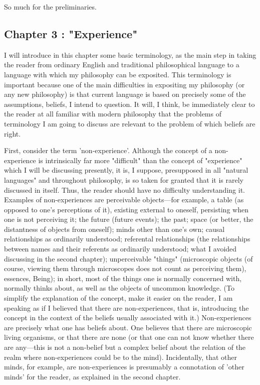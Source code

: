 \documentclass[10pt,twoside]{memoir}
\begin{document}
\begin{enumerate}
So much for the preliminaries. 

\subsection*{Chapter 3 : "Experience"}

I will introduce in this chapter some basic terminology, as the main step 
in taking the reader from ordinary English and traditional philosophical 
language to a language with which my philosophy can be exposited. This 
terminology is important because one of the main difficulties in expositing 
my philosophy (or any new philosophy) is that current language is based on 
precisely some of the assumptions, beliefs, I intend to question. It will, I 
think, be immediately clear to the reader at all familiar with modern 
philosophy that the problems of terminology I am going to discuss are 
relevant to the problem of which beliefs are right. 

First, consider the term 'non-experience'. Although the concept of a 
non-experience is intrinsically far more "difficult" than the concept of 
"experience" which I will be discussing presently, it is, I suppose, 
presupposed in all "natural languages" and throughout philosophy, is so 
taken for granted that it is rarely discussed in itself. Thus, the reader should 
have no difficulty understanding it. Examples of non-experiences are 
perceivable objects---for example, a table (as opposed to one's perceptions of 
it), existing external to oneself, persisting when one is not perceiving it; the 
future (future events); the past; space (or better, the distantness of objects 
from oneself); minds other than one's own; causal relationships as ordinarily 
understood; referental relationships (the relationships between names and 
their referents as ordinarily understood; what I avoided discussing in the 
second chapter); unperceivable "things" (microscopic objects (of course, 
viewing them through microscopes does not count as perceiving them), 
essences, Being); in short, most of the things one is normally concerned with, 
normally thinks about, as well as the objects of uncommon knowledge. (To 
simplify the explanation of the concept, make it easier on the reader, I am 
speaking as if I believed that there are non-experiences, that is, introducing 
the concept in the context of the beliefs usually associated with it.) 
Non-experiences are precisely what one has beliefs about. One believes that 
there are microscopic living organisms, or that there are none (or that one 
can not know whether there are any---this is not a non-belief but a complex 
belief about the relation of the realm where non-experiences could be to the 
mind). Incidentally, that other minds, for example, are non-experiences is 
presumably a connotation of 'other minds' for the reader, as explained in the 
second chapter. 


\end{enumerate}
\end{document}

